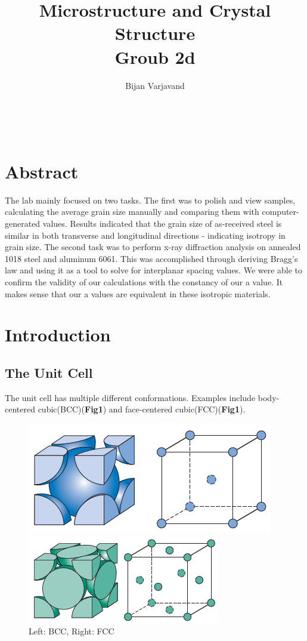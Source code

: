 \documentclass{article}
\author{Bijan Varjavand}
\title{Microstructure and Crystal Structure\\Groub 2d}
\begin{document}
\maketitle
\ \\[2.5in]

\section{Abstract}
\centering
The lab mainly focused on two tasks. The first was to polish and view samples, calculating the average grain size manually and comparing them with computer-generated values. Results indicated that the grain size of as-received steel is similar in both transverse and longitudinal directions - indicating isotropy in grain size. The second task was to perform x-ray diffraction analysis on annealed 1018 steel and aluminum 6061. This was accomplished through deriving Bragg's law and using it as a tool to solve for interplanar spacing values. We were able to confirm the validity of our calculations with the constancy of our a value. It makes sense that our a values are equivalent in these isotropic materials.

\clearpage

\raggedright
\section{Introduction}

\subsection{The Unit Cell}

The unit cell has multiple different conformations. Examples include body-centered cubic(BCC)(\textbf{Fig1}) and face-centered cubic(FCC)(\textbf{Fig1}).

\begin{figure}[h]
	\begin{minipage}{0.5\textwidth}
		\centering
		\includegraphics[scale=.5]{bcc.png}
	\end{minipage}
	\begin{minipage}{0.5\textwidth}
		\centering
		\includegraphics[scale=.6]{fcc.png}
	\end{minipage}
	\caption{Left: BCC, Right: FCC}
\end{figure}
\end{document}
